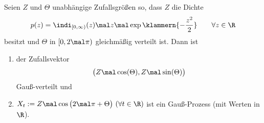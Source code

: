 \begin{aufgabenr}\label{aufg:12}\enter
	Seien $Z$ und $\Theta$ unabhängige Zufallsgrößen so, dass $Z$ die Dichte
	\begin{align*}
		p(z)=\indi_{[0,\infty)}(z)\mal z\mal\exp\klammern{-\frac{z^2}{2}}\qquad\forall z\in\R
	\end{align*}
	besitzt und $ \Theta$ in $[0,2\mal\pi)$ gleichmäßig verteilt ist.
	Dann ist
	\begin{enumerate}[label=(\alph*)]
		\item der Zufallsvektor
		\begin{align*}
			\big(Z\mal\cos(\Theta),Z\mal\sin(\Theta)\big)
		\end{align*}
		Gauß-verteilt und
		\item $\begin{aligned}
			X_t:=Z\mal\cos\big(2\mal\pi+\Theta\big)~(\forall t\in\R)
		\end{aligned}$
		ist ein Gauß-Prozess (mit Werten in $\R$).
	\end{enumerate}
\end{aufgabenr}











